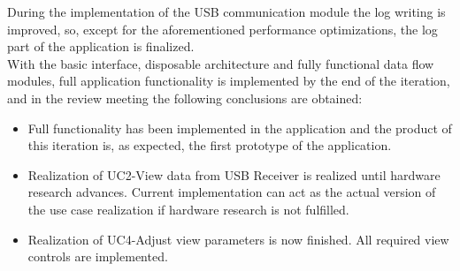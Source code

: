 			During the implementation of the USB communication module the log writing is improved, so, except for the aforementioned performance optimizations, the log part of the application is finalized.\\

			With the basic interface, disposable architecture and fully functional data flow modules, full application functionality is implemented by the end of the iteration, and in the review meeting the following conclusions are obtained:
			\begin{itemize}
				\item Full functionality has been implemented in the application and the product of this iteration is, as expected, the first prototype of the application.
				\item Realization of UC2-View data from USB Receiver is realized until hardware research advances. Current implementation can act as the actual version of the use case realization if hardware research is not fulfilled.
				\item Realization of UC4-Adjust view parameters is now finished. All required view controls are implemented.
			\end{itemize}

